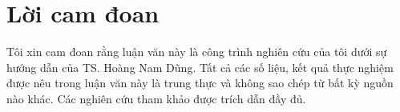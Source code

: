 \chapter*{Lời cam đoan}
Tôi xin cam đoan rằng luận văn này là công trình nghiên cứu của tôi dưới sự hướng dẫn của TS. Hoàng Nam Dũng. Tất cả các số liệu, kết quả thực nghiệm được nêu trong luận văn này là trung thực và không sao chép từ bất kỳ nguồn nào khác. Các nghiên cứu tham khảo được trích dẫn đầy đủ.